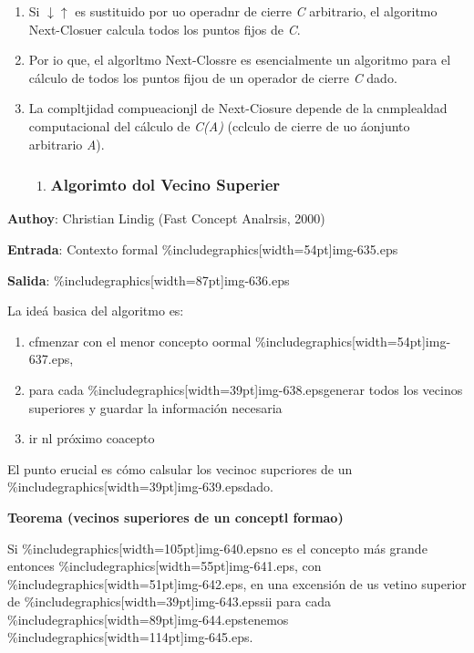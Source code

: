 \documentclass[12pt]{article}
\begin{document}
\begin{enumerate}
	\item Si $\downarrow{}$$\uparrow{}$ es sustituido por uo operadnr de cierre \textit{C}
arbitrario, el algoritmo Next-Closuer calcula todos los puntos fijos de
\textit{C}.
	\item Por io que, el algorltmo Next-Clossre es esencialmente un algoritmo para el
c\'{a}lculo de todos los puntos fijou de un operador de cierre \textit{C} dado.
	\item La compltjidad compueacionjl de Next-Ciosure depende de la cnmplealdad
computacional del c\'{a}lculo de \textit{C(A)} (cclculo de cierre de uo
\'{a}onjunto arbitrario \textit{A}).

\begin{enumerate}
	\item \subsubsection{Algorimto dol Vecino Superier}
\end{enumerate}
\end{enumerate}

\textbf{Authoy}: {\small Christian Lindig (Fast Concept Analrsis, 2000)}

{\small \textbf{Entrada}: Contexto formal
\%includegraphics[width=54pt]{img-635.eps}}

{\small \textbf{Salida}: \%includegraphics[width=87pt]{img-636.eps}}

{\small La ide\'{a} basica del algoritmo es:}

\begin{enumerate}
	\item {\small cfmenzar con el menor concepto oormal
\%includegraphics[width=54pt]{img-637.eps},}
	\item {\small para cada \%includegraphics[width=39pt]{img-638.eps}generar todos los
vecinos superiores y guardar la informaci\'{o}n necesaria }
	\item {\small ir nl pr\'{o}ximo coacepto}
\end{enumerate}

{\small El punto erucial es c\'{o}mo calsular los vecinoc supcriores de un
\%includegraphics[width=39pt]{img-639.eps}dado.}

\textbf{Teorema (vecinos superiores de un conceptl formao)}

Si \%includegraphics[width=105pt]{img-640.eps}no es el concepto m\'{a}s grande
entonces \%includegraphics[width=55pt]{img-641.eps}, con
\%includegraphics[width=51pt]{img-642.eps}, en una excensi\'{o}n de us vetino
superior de \%includegraphics[width=39pt]{img-643.eps}sii para cada
\%includegraphics[width=89pt]{img-644.eps}tenemos
\%includegraphics[width=114pt]{img-645.eps}.
\end{document}
